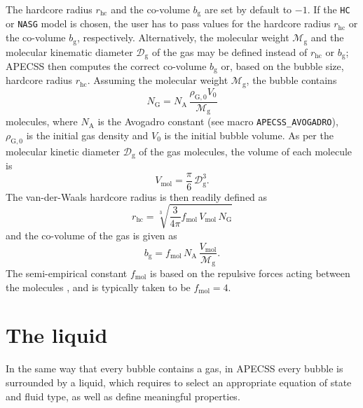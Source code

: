 The hardcore radius $r_\mathrm{hc}$ and the co-volume $b_\mathrm{g}$ are set by default to $-1$. If the {\tt HC} or {\tt NASG} model is chosen, the user has to pass values for the hardcore radius $r_\mathrm{hc}$ or the co-volume $b_\mathrm{g}$, respectively. Alternatively, the molecular weight $\mathcal{M}_{\text{g}}$ and the molecular kinematic diameter $\mathcal{D}_{\text{g}}$ of the gas may be defined instead of $r_\mathrm{hc}$ or $b_\mathrm{g}$; APECSS then computes the correct co-volume $b_\mathrm{g}$ or, based on the bubble size, hardcore radius $r_\mathrm{hc}$. Assuming the molecular weight $\mathcal{M}_{\text{g}}$, the bubble contains 
\begin{equation}
    N_\mathrm{G} = N_\mathrm{A} \, \frac{\rho_{\mathrm{G},0} V_0}{\mathcal{M}_{\text{g}}} 
\end{equation}
molecules, where $N_\mathrm{A}$ is the Avogadro constant (see macro {\tt APECSS\_AVOGADRO}), $\rho_{\mathrm{G},0}$ is the initial gas density and $V_0$ is the initial bubble volume. As per the molecular kinetic diameter $\mathcal{D}_{\text{g}}$ of the gas molecules, the volume of each molecule is
\begin{equation}
    V_\mathrm{mol} = \frac{\pi}{6} \, \mathcal{D}_{\text{g}}^3.
\end{equation}
The van-der-Waals hardcore radius is then readily defined as
\begin{equation}
    r_\mathrm{hc} = \sqrt[3]{\frac{3}{4 \pi} f_\mathrm{mol} \, V_\mathrm{mol} \, N_\mathrm{G}}
\end{equation}
and the co-volume of the gas is given as
\begin{equation}
    b_\mathrm{g} = f_\mathrm{mol} \, N_\mathrm{A} \, \frac{V_\mathrm{mol}}{\mathcal{M}_{\text{g}}}.
\end{equation}
The semi-empirical constant $f_\mathrm{mol}$ is based on the repulsive forces acting between the molecules \citep{Kontogeorgis2019}, and is typically taken to be $f_\mathrm{mol}=4$.


\section{The liquid}
\label{sec:liquid}

In the same way that every bubble contains a gas, in APECSS every bubble is surrounded by a liquid, which requires to select an appropriate equation of state and fluid type, as well as define meaningful properties.

\vspace{0.8em}

